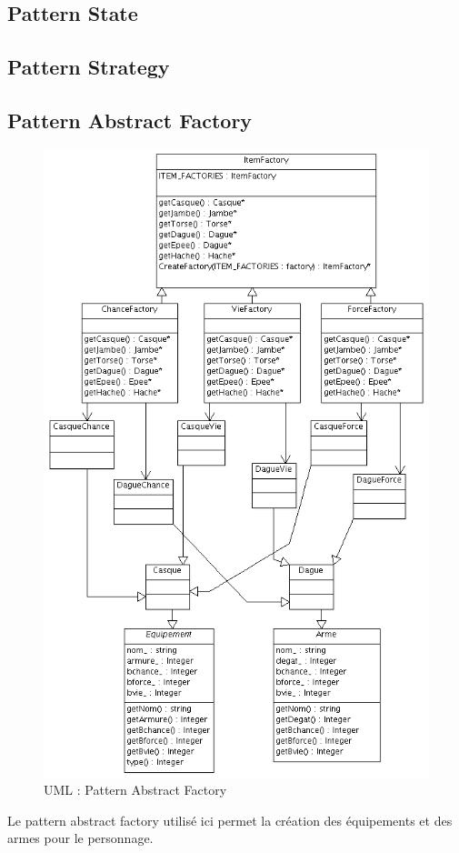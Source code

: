 \documentclass[a4paper]{article}
\begin{document}
      \subsection{Pattern State}
      \subsection{Pattern Strategy}
      \newpage
      \subsection{Pattern Abstract Factory}
	  \begin{figure}[h]
		\centering
			\includegraphics[width=11.5cm]{./Factory_UML.png}
		\caption{UML : Pattern Abstract Factory}
		\label{fig:Factory_UML}
	  \end{figure}
	\newpage
Le pattern abstract factory utilisé ici permet la création des équipements et des armes pour le personnage.
\end{document}
